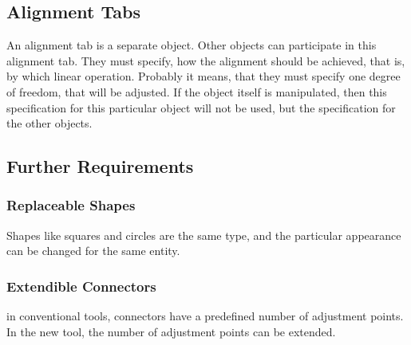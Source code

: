 \documentclass{sig-alternate}
\begin{document}
\subsection{Alignment Tabs}
An alignment tab is a separate object. Other objects can participate in this alignment tab. They must specify, how the alignment should be achieved, that is, by which linear operation. Probably it means, that they must specify one degree of freedom, that will be adjusted.
If the object itself is manipulated, then this specification for this particular object will not be used, but the specification for the other objects.

\subsection{Further Requirements}

\subsubsection{Replaceable Shapes}
Shapes like squares and circles are the same type, and the particular appearance can be changed for the same entity.

\subsubsection{Extendible Connectors}
in conventional tools, connectors have a predefined number of adjustment points. In the new tool, the number of adjustment points can be extended. 






\end{document}
